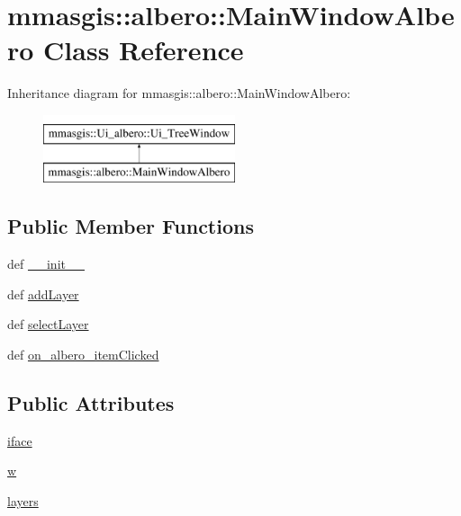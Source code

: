 \hypertarget{classmmasgis_1_1albero_1_1MainWindowAlbero}{
\section{mmasgis::albero::MainWindowAlbero Class Reference}
\label{classmmasgis_1_1albero_1_1MainWindowAlbero}
}
Inheritance diagram for mmasgis::albero::MainWindowAlbero:\begin{figure}[H]
\begin{center}
\leavevmode
\includegraphics[height=2.000000cm]{classmmasgis_1_1albero_1_1MainWindowAlbero}
\end{center}
\end{figure}
\subsection*{Public Member Functions}
\begin{DoxyCompactItemize}
\item 
def \hyperlink{classmmasgis_1_1albero_1_1MainWindowAlbero_a9e1c72560b17e31795276a87321fd737}{\_\-\_\-init\_\-\_\-}
\item 
def \hyperlink{classmmasgis_1_1albero_1_1MainWindowAlbero_ad18d752e34c27c241be7efcfefe9ae77}{addLayer}
\item 
def \hyperlink{classmmasgis_1_1albero_1_1MainWindowAlbero_a3f15a4b5832167c3f91252fd79064be5}{selectLayer}
\item 
def \hyperlink{classmmasgis_1_1albero_1_1MainWindowAlbero_a4d56531f92c49dc140b1adfb9eb586f8}{on\_\-albero\_\-itemClicked}
\end{DoxyCompactItemize}
\subsection*{Public Attributes}
\begin{DoxyCompactItemize}
\item 
\hyperlink{classmmasgis_1_1albero_1_1MainWindowAlbero_add92d826ea909d9add216b4fe97eb00a}{iface}
\item 
\hyperlink{classmmasgis_1_1albero_1_1MainWindowAlbero_ad4bd4eed0219da0e6aaed5945638dd23}{w}
\item 
\hyperlink{classmmasgis_1_1albero_1_1MainWindowAlbero_af3fc9108aaee3612a8012246d179d9cd}{layers}
\end{DoxyCompactItemize}


